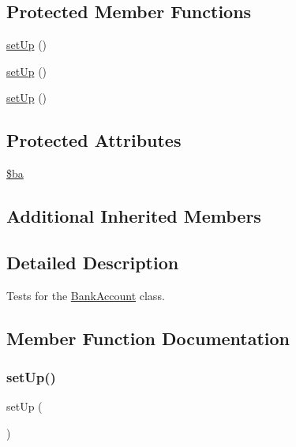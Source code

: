 \subsection*{Protected Member Functions}
\begin{DoxyCompactItemize}
\item 
\mbox{\hyperlink{class_bank_account_test_a0bc688732d2b3b162ffebaf7812e78da}{set\+Up}} ()
\item 
\mbox{\hyperlink{class_bank_account_test_a0bc688732d2b3b162ffebaf7812e78da}{set\+Up}} ()
\item 
\mbox{\hyperlink{class_bank_account_test_a0bc688732d2b3b162ffebaf7812e78da}{set\+Up}} ()
\end{DoxyCompactItemize}
\subsection*{Protected Attributes}
\begin{DoxyCompactItemize}
\item 
\mbox{\hyperlink{class_bank_account_test_ae7b743e1b852cb919e9e56c76b9f4558}{\$ba}}
\end{DoxyCompactItemize}
\subsection*{Additional Inherited Members}


\subsection{Detailed Description}
Tests for the \mbox{\hyperlink{class_bank_account}{Bank\+Account}} class. 

\subsection{Member Function Documentation}
\mbox{\label{class_bank_account_test_a0bc688732d2b3b162ffebaf7812e78da}} 
\subsubsection{\texorpdfstring{set\+Up()}{setUp()}\hspace{0.1cm}{\footnotesize\ttfamily [1/3]}}
{\footnotesize\ttfamily set\+Up (\begin{DoxyParamCaption}{ }\end{DoxyParamCaption})\hspace{0.3cm}{\ttfamily [protected]}}

